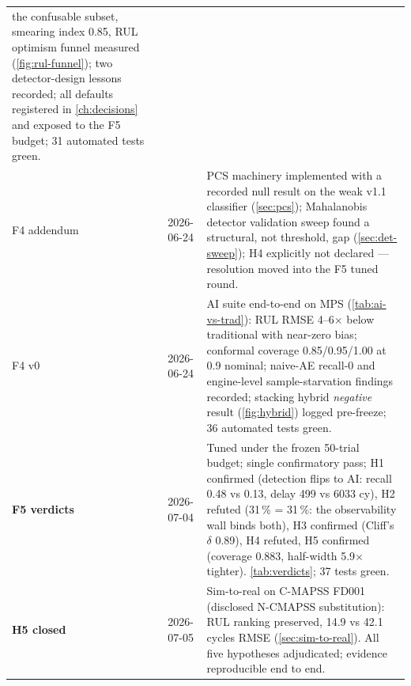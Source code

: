 \begin{table}[htbp]
\begin{tabular}{lp{}p{}}
      the confusable subset, smearing index 0.85, RUL optimism funnel measured
      (\cref{fig:rul-funnel}); two detector-design lessons recorded; all defaults registered
      in \cref{ch:decisions} and exposed to the F5 budget; 31 automated tests green. \\
    F4 addendum & 2026-06-24 & PCS machinery implemented with a
      recorded null result on the weak v1.1 classifier (\cref{sec:pcs}); Mahalanobis
      detector validation sweep found a structural, not threshold, gap
      (\cref{sec:det-sweep}); H4 explicitly not declared --- resolution moved into the F5
      tuned round. \\
    F4 v0 & 2026-06-24 & AI suite end-to-end on MPS (\cref{tab:ai-vs-trad}): RUL RMSE
      4--6$\times$ below traditional with near-zero bias; conformal coverage
      0.85/0.95/1.00 at 0.9 nominal; naive-AE recall-0 and engine-level sample-starvation
      findings recorded; stacking hybrid \emph{negative} result (\cref{fig:hybrid}) logged
      pre-freeze; 36 automated tests green. \\
    \textbf{F5 verdicts} & 2026-07-04 & Tuned under the frozen 50-trial budget; single
      confirmatory pass; H1 confirmed (detection flips to AI: recall 0.48 vs 0.13, delay
      499 vs 6033 cy), H2 refuted (31\,\% = 31\,\%: the observability wall binds both),
      H3 confirmed (Cliff's $\delta$ 0.89), H4 refuted, H5 confirmed (coverage 0.883,
      half-width 5.9$\times$ tighter). \cref{tab:verdicts}; 37 tests green. \\
    \textbf{H5 closed} & 2026-07-05 & Sim-to-real on C-MAPSS FD001 (disclosed N-CMAPSS
      substitution): RUL ranking preserved, 14.9 vs 42.1 cycles RMSE
      (\cref{sec:sim-to-real}). All five hypotheses adjudicated; evidence reproducible end
      to end. \\
    \bottomrule
  \end{tabular}
\end{table}

